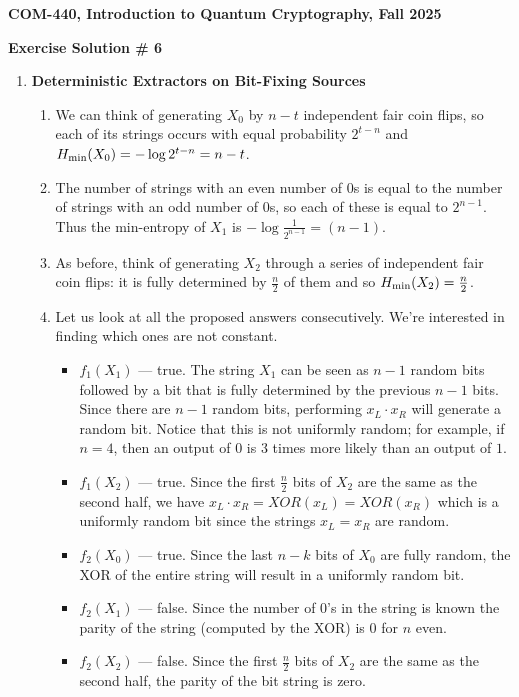 \documentclass[12pt]{article}
\newcommand{\header}[1]{\begin{center} {\large\bf #1} \end{center}}
\begin{document}
\header{COM-440, Introduction to Quantum Cryptography, Fall 2025}
\header{\bf Exercise Solution \# 6}


\begin{enumerate}

\item {\bf Deterministic Extractors on Bit-Fixing Sources}

\begin{enumerate}
\item We can think of generating $X_0$ by $n-t$ independent fair coin flips, so each of its strings occurs with equal probability $2^{t-n}$ and $H_{\rm min} (X_0) = -\log{2^{t-n}}=n-t$.

\item The number of strings with an even number of $0$s is equal to the number of strings with an odd number of $0$s, so each of these is equal to $2^{n-1}$. Thus the min-entropy of $X_1$ is $-\log \frac{1}{2^{n-1}}=(n-1)$.

\item As before, think of generating $X_2$ through a series of independent fair coin flips: it is fully determined by $\frac {n}{2}$ of them and so $H_{\rm min}(X_2)=\frac{n}{2}$.

\item Let us look at all the proposed answers consecutively. We're interested in finding which ones are not constant.
\begin{itemize}
\item $f_1(X_1)$ --- true. The string $X_1$ can be seen as $n-1$ random bits followed by a bit that is fully determined by the previous $n-1$ bits. Since there are $n-1$ random bits, performing \(x_ L\cdot x_ R \) will generate a random bit. Notice that this is not uniformly random; for example, if $n=4$, then an output of $0$ is $3$ times more likely than an output of $1$.
\item $f_1(X_2)$ --- true. Since the first \(\frac{n}{2}\) bits of $X_2$ are the same as the second half, we have \(x_ L\cdot x_ R  = XOR(x_L) = XOR(x_R)\) which is a uniformly random bit since the strings \(x_L=x_R\) are random.
\item $f_2(X_0)$ --- true. Since the last \(n-k\) bits of $X_0$ are fully random, the XOR of the entire string will result in a uniformly random bit.
\item $f_2(X_1)$ --- false. Since the number of $0$'s in the string is known the parity of the string (computed by the XOR) is $0$ for $n$ even.
\item $f_2(X_2)$ --- false. Since the first \(\frac{n}{2}\) bits of $X_2$ are the same as the second half, the parity of the bit string is zero.
\end{itemize}


\end{enumerate}
\end{enumerate}
\end{document}
